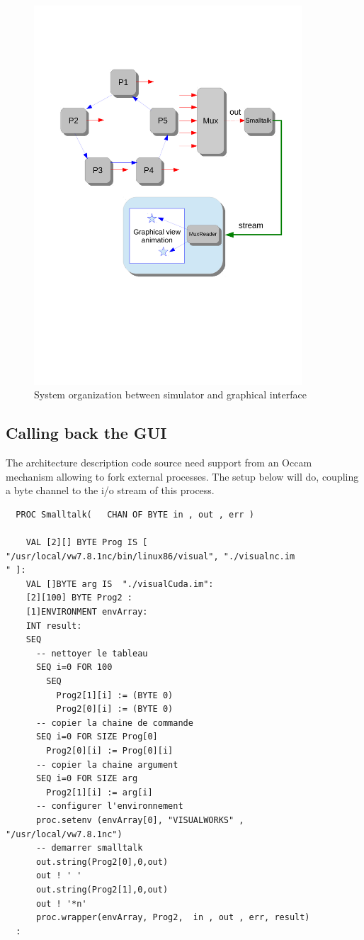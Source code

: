 \begin{figure}[hbtp]
\begin{center} 
\includegraphics[width=10cm] {mux4-st.pdf}
\caption{System organization between simulator and graphical interface}
\label{fig:mux4-st}
\end{center}
\end{figure}
 

\subsection{Calling back the GUI}

The architecture description code source need support from an Occam mechanism allowing 
to fork external processes. The setup below will do, coupling a byte channel
to the i/o stream of this process.

\begin{lstlisting}
  PROC Smalltalk(   CHAN OF BYTE in , out , err )

    VAL [2][] BYTE Prog IS [ "/usr/local/vw7.8.1nc/bin/linux86/visual", "./visualnc.im                          " ]:
    VAL []BYTE arg IS  "./visualCuda.im":
    [2][100] BYTE Prog2 :
    [1]ENVIRONMENT envArray:
    INT result:
    SEQ
      -- nettoyer le tableau
      SEQ i=0 FOR 100
        SEQ
          Prog2[1][i] := (BYTE 0)
          Prog2[0][i] := (BYTE 0)
      -- copier la chaine de commande
      SEQ i=0 FOR SIZE Prog[0]
        Prog2[0][i] := Prog[0][i]
      -- copier la chaine argument
      SEQ i=0 FOR SIZE arg
        Prog2[1][i] := arg[i]
      -- configurer l'environnement
      proc.setenv (envArray[0], "VISUALWORKS" , "/usr/local/vw7.8.1nc")
      -- demarrer smalltalk
      out.string(Prog2[0],0,out)
      out ! ' '
      out.string(Prog2[1],0,out)
      out ! '*n'
      proc.wrapper(envArray, Prog2,  in , out , err, result)
  :
\end{lstlisting}


